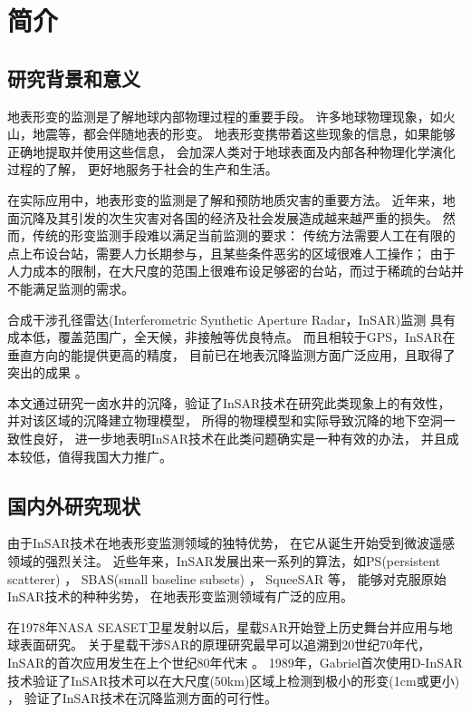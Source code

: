 
\chapter{简介}

\section{研究背景和意义}

地表形变的监测是了解地球内部物理过程的重要手段。
许多地球物理现象，如火山，地震等，都会伴随地表的形变。
地表形变携带着这些现象的信息，如果能够正确地提取并使用这些信息，
会加深人类对于地球表面及内部各种物理化学演化过程的了解，
更好地服务于社会的生产和生活。

在实际应用中，地表形变的监测是了解和预防地质灾害的重要方法。
近年来，地面沉降及其引发的次生灾害对各国的经济及社会发展造成越来越严重的损失。
然而，传统的形变监测手段难以满足当前监测的要求：
传统方法需要人工在有限的点上布设台站，需要人力长期参与，且某些条件恶劣的区域很难人工操作；
由于人力成本的限制，在大尺度的范围上很难布设足够密的台站，而过于稀疏的台站并不能满足监测的需求。

合成干涉孔径雷达(Interferometric Synthetic Aperture Radar，InSAR)监测
具有成本低，覆盖范围广，全天候，非接触等优良特点。
而且相较于GPS，InSAR在垂直方向的能提供更高的精度，%
目前已在地表沉降监测方面广泛应用，且取得了突出的成果
\cite{kimEvolutionSinkholesWink2019b,shiSubsidenceSinkholesWink2019a}。

本文通过研究一卤水井的沉降，验证了InSAR技术在研究此类现象上的有效性，
并对该区域的沉降建立物理模型，
所得的物理模型和实际导致沉降的地下空洞一致性良好，
进一步地表明InSAR技术在此类问题确实是一种有效的办法，
并且成本较低，值得我国大力推广。

\section{国内外研究现状}
由于InSAR技术在地表形变监测领域的独特优势，
在它从诞生开始受到微波遥感领域的强烈关注。
近些年来，InSAR发展出来一系列的算法，如PS(persistent scatterer)
\cite{ferrettiPermanentScatterersSAR2001,hooperNewMethodMeasuring2004}，
SBAS(small baseline subsets)
\cite{berardinoNewAlgorithmSurface2002,hooperMultitemporalInSARMethod2008}，
SqueeSAR\cite{ferrettiNewAlgorithmProcessing2011}
等，
能够对克服原始InSAR技术的种种劣势，
在地表形变监测领域有广泛的应用。

在1978年NASA SEASET卫星发射以后，星载SAR开始登上历史舞台并应用与地球表面研究。
关于星载干涉SAR的原理研究最早可以追溯到20世纪70年代\cite{ziskNewEarthbasedRadar1972}，
InSAR的首次应用发生在上个世纪80年代末
\cite{zebkerTopographicMappingInterferometric1986,goldsteinInterferometricRadarMeasurement1987}。
1989年，Gabriel首次使用D-InSAR技术验证了InSAR技术可以在大尺度(50km)区域上检测到极小的形变(1cm或更小)
\cite{gabrielMappingSmallElevation1989}，
验证了InSAR技术在沉降监测方面的可行性。

